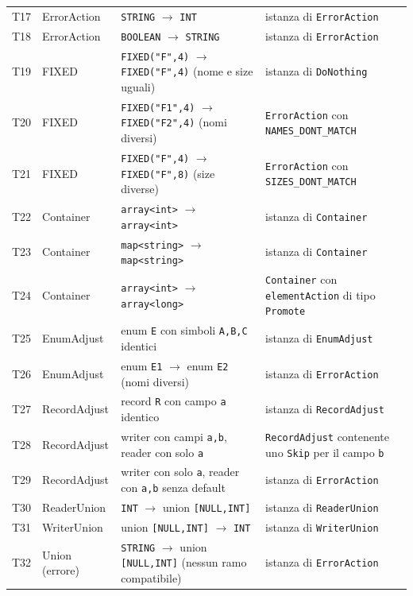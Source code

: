 \begin{longtable}{@{}p{0.9cm}p{2.6cm}p{6.1cm}p{5.7cm}@{}}
T17 & ErrorAction & \texttt{STRING} $\to$ \texttt{INT} & istanza di \texttt{ErrorAction} \\
T18 & ErrorAction & \texttt{BOOLEAN} $\to$ \texttt{STRING} & istanza di \texttt{ErrorAction} \\
T19 & FIXED & \texttt{FIXED("F",4)} $\to$ \texttt{FIXED("F",4)} (nome e size uguali) & istanza di \texttt{DoNothing} \\
T20 & FIXED & \texttt{FIXED("F1",4)} $\to$ \texttt{FIXED("F2",4)} (nomi diversi) & \texttt{ErrorAction} con \texttt{NAMES\_DONT\_MATCH} \\
T21 & FIXED & \texttt{FIXED("F",4)} $\to$ \texttt{FIXED("F",8)} (size diverse) & \texttt{ErrorAction} con \texttt{SIZES\_DONT\_MATCH} \\
T22 & Container & \texttt{array<int>} $\to$ \texttt{array<int>} & istanza di \texttt{Container} \\
T23 & Container & \texttt{map<string>} $\to$ \texttt{map<string>} & istanza di \texttt{Container} \\
T24 & Container & \texttt{array<int>} $\to$ \texttt{array<long>} & \texttt{Container} con \texttt{elementAction} di tipo \texttt{Promote} \\
T25 & EnumAdjust & enum \texttt{E} con simboli \texttt{A,B,C} identici & istanza di \texttt{EnumAdjust} \\
T26 & EnumAdjust & enum \texttt{E1} $\to$ enum \texttt{E2} (nomi diversi) & istanza di \texttt{ErrorAction} \\
T27 & RecordAdjust & record \texttt{R} con campo \texttt{a} identico & istanza di \texttt{RecordAdjust} \\
T28 & RecordAdjust & writer con campi \texttt{a,b}, reader con solo \texttt{a} & \texttt{RecordAdjust} contenente uno \texttt{Skip} per il campo \texttt{b} \\
T29 & RecordAdjust & writer con solo \texttt{a}, reader con \texttt{a,b} senza default & istanza di \texttt{ErrorAction} \\
T30 & ReaderUnion & \texttt{INT} $\to$ union \texttt{[NULL,INT]} & istanza di \texttt{ReaderUnion} \\
T31 & WriterUnion & union \texttt{[NULL,INT]} $\to$ \texttt{INT} & istanza di \texttt{WriterUnion} \\
T32 & Union (errore) & \texttt{STRING} $\to$ union \texttt{[NULL,INT]} (nessun ramo compatibile) & istanza di \texttt{ErrorAction} \\
\bottomrule
\end{longtable}

